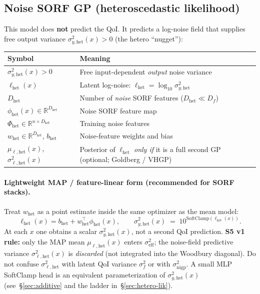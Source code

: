 \documentclass[11pt]{article}
\newcommand{\sighet}{\sigma_{y,\mathrm{het}}^{2}}%
\newcommand{\signigp}{\sigma_{\mathrm{nigp}}^{2}}%
\newcommand{\sigeff}{\sigma_{\mathrm{eff}}^{2}}%
\newcommand{\Phihet}{\Phi_{\mathrm{het}}}%
\begin{document}
\subsection{Noise SORF GP (heteroscedastic likelihood)}
\label{sec:noise-sorf-notation}
This model does \textbf{not} predict the QoI.
It predicts a log-noise field that supplies free output variance $\sighet(x)>0$
(the hetero ``nugget''):
\begin{center}
\small
\begin{tabularx}{\textwidth}{@{}>{\raggedright\arraybackslash}p{}
  >{\raggedright\arraybackslash}X@{}}
\toprule
\textbf{Symbol} & \textbf{Meaning} \\
\midrule
$\sighet(x)>0$ & Free input-dependent \emph{output} noise variance \\
$\ell_{\mathrm{het}}(x)$ & Latent log-noise: $\ell_{\mathrm{het}}=\log_{10}\sighet$ \\
$D_{\mathrm{het}}$ & Number of \emph{noise} SORF features ($D_{\mathrm{het}}\ll D_f$) \\
$\phi_{\mathrm{het}}(x)\in\mathbb{R}^{D_{\mathrm{het}}}$ & Noise SORF feature map \\
$\Phihet\in\mathbb{R}^{n\times D_{\mathrm{het}}}$ & Training noise features \\
$w_{\mathrm{het}}\in\mathbb{R}^{D_{\mathrm{het}}}$, $b_{\mathrm{het}}$
  & Noise-feature weights and bias \\
$\mu_{\ell,\mathrm{het}}(x)$, $\sigma_{\ell,\mathrm{het}}^{2}(x)$
  & Posterior of $\ell_{\mathrm{het}}$ \emph{only if} it is a full second GP
  (optional; Goldberg / VHGP) \\
\bottomrule
\end{tabularx}
\end{center}

\paragraph{Lightweight MAP / feature-linear form (recommended for SORF stacks).}
Treat $w_{\mathrm{het}}$ as a point estimate inside the same optimizer as the mean model:
\begin{equation}
\label{eq:noise-sorf-map}
  \ell_{\mathrm{het}}(x)=b_{\mathrm{het}}+w_{\mathrm{het}}^{\top}\phi_{\mathrm{het}}(x),\qquad
  \sighet(x)
  \;=\;
  10^{\mathrm{SoftClamp}(\ell_{\mathrm{het}}(x))}.
\end{equation}
At each $x$ one obtains a scalar $\sighet(x)$, not a second QoI prediction.
\textbf{S5 v1 rule:} only the MAP mean $\mu_{\ell,\mathrm{het}}(x)$ enters $\sigeff$;
the noise-field predictive variance $\sigma_{\ell,\mathrm{het}}^{2}(x)$ is
\emph{discarded} (not integrated into the Woodbury diagonal).
Do not confuse $\sigma_{\ell,\mathrm{het}}^{2}$ with latent QoI variance $\sigma_f^{2}$
or with $\signigp$.
A small MLP SoftClamp head is an equivalent parameterization of $\sighet(x)$
(see~\S\ref{sec:additive} and the ladder in~\S\ref{sec:hetero-lik}).
\end{document}

